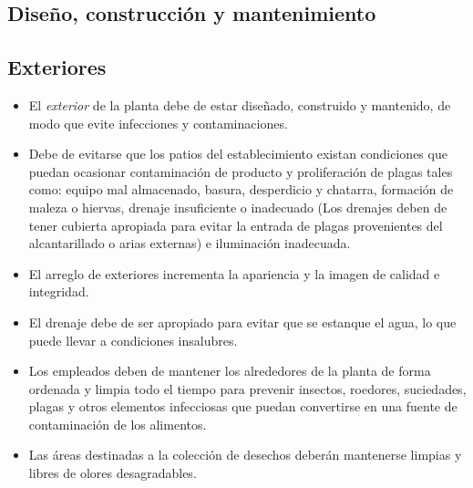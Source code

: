 \subsection{Diseño, construcción y mantenimiento}

\subsection{Exteriores}
\begin{itemize}
	\item El \emph{exterior} de la planta debe de estar diseñado, construido y mantenido, de modo que evite infecciones y contaminaciones.
	\item Debe de evitarse que los patios del establecimiento existan condiciones que puedan ocasionar contaminación de producto y proliferación de plagas tales como: equipo mal almacenado, basura, desperdicio y chatarra, formación de maleza o hiervas, drenaje insuficiente o inadecuado (Los drenajes deben de tener cubierta apropiada para evitar la entrada de plagas provenientes del alcantarillado o arias externas) e iluminación inadecuada.
	\item El arreglo de exteriores incrementa la apariencia y la imagen de calidad e integridad.
	\item El drenaje debe de ser apropiado para evitar que se estanque el agua, lo que puede llevar a condiciones insalubres.
	\item Los empleados deben de mantener los alrededores de la planta de forma ordenada y limpia todo el tiempo para prevenir insectos, roedores, suciedades, plagas y otros elementos infecciosas que puedan convertirse en una fuente de contaminación de los alimentos.
	\item Las áreas destinadas a la colección de desechos deberán mantenerse limpias y libres de olores desagradables.
\end{itemize}

